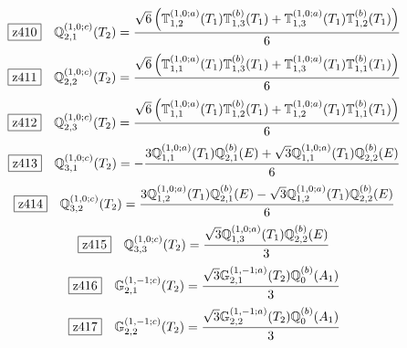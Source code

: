 \documentclass[fleqn,10pt,landscape]{jsarticle}
\begin{document}
\begin{dmath*}
\hspace*{3mm}\fbox{z410}\quad \mathbb{Q}_{2,1}^{(1,0;c)}(T_{2})=\frac{\sqrt{6} \left(\mathbb{T}_{1,2}^{(1,0;a)}(T_{1}) \mathbb{T}_{1,3}^{(b)}(T_{1}) + \mathbb{T}_{1,3}^{(1,0;a)}(T_{1}) \mathbb{T}_{1,2}^{(b)}(T_{1})\right)}{6}
\end{dmath*}
\begin{dmath*}
\hspace*{3mm}\fbox{z411}\quad \mathbb{Q}_{2,2}^{(1,0;c)}(T_{2})=\frac{\sqrt{6} \left(\mathbb{T}_{1,1}^{(1,0;a)}(T_{1}) \mathbb{T}_{1,3}^{(b)}(T_{1}) + \mathbb{T}_{1,3}^{(1,0;a)}(T_{1}) \mathbb{T}_{1,1}^{(b)}(T_{1})\right)}{6}
\end{dmath*}
\begin{dmath*}
\hspace*{3mm}\fbox{z412}\quad \mathbb{Q}_{2,3}^{(1,0;c)}(T_{2})=\frac{\sqrt{6} \left(\mathbb{T}_{1,1}^{(1,0;a)}(T_{1}) \mathbb{T}_{1,2}^{(b)}(T_{1}) + \mathbb{T}_{1,2}^{(1,0;a)}(T_{1}) \mathbb{T}_{1,1}^{(b)}(T_{1})\right)}{6}
\end{dmath*}
\begin{dmath*}
\hspace*{3mm}\fbox{z413}\quad \mathbb{Q}_{3,1}^{(1,0;c)}(T_{2})=- \frac{3 \mathbb{Q}_{1,1}^{(1,0;a)}(T_{1}) \mathbb{Q}_{2,1}^{(b)}(E) + \sqrt{3} \mathbb{Q}_{1,1}^{(1,0;a)}(T_{1}) \mathbb{Q}_{2,2}^{(b)}(E)}{6}
\end{dmath*}
\begin{dmath*}
\hspace*{3mm}\fbox{z414}\quad \mathbb{Q}_{3,2}^{(1,0;c)}(T_{2})=\frac{3 \mathbb{Q}_{1,2}^{(1,0;a)}(T_{1}) \mathbb{Q}_{2,1}^{(b)}(E) - \sqrt{3} \mathbb{Q}_{1,2}^{(1,0;a)}(T_{1}) \mathbb{Q}_{2,2}^{(b)}(E)}{6}
\end{dmath*}
\begin{dmath*}
\hspace*{3mm}\fbox{z415}\quad \mathbb{Q}_{3,3}^{(1,0;c)}(T_{2})=\frac{\sqrt{3} \mathbb{Q}_{1,3}^{(1,0;a)}(T_{1}) \mathbb{Q}_{2,2}^{(b)}(E)}{3}
\end{dmath*}
\begin{dmath*}
\hspace*{3mm}\fbox{z416}\quad \mathbb{G}_{2,1}^{(1,-1;c)}(T_{2})=\frac{\sqrt{3} \mathbb{G}_{2,1}^{(1,-1;a)}(T_{2}) \mathbb{Q}_{0}^{(b)}(A_{1})}{3}
\end{dmath*}
\begin{dmath*}
\hspace*{3mm}\fbox{z417}\quad \mathbb{G}_{2,2}^{(1,-1;c)}(T_{2})=\frac{\sqrt{3} \mathbb{G}_{2,2}^{(1,-1;a)}(T_{2}) \mathbb{Q}_{0}^{(b)}(A_{1})}{3}
\end{dmath*}
\end{document}
